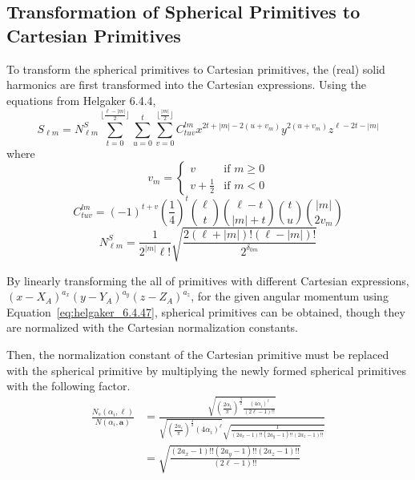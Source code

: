 \documentclass[letterpaper]{article}
\begin{document}
\subsection{Transformation of Spherical Primitives to Cartesian Primitives}
To transform the spherical primitives to Cartesian primitives, the (real) solid
harmonics are first transformed into the Cartesian expressions.
Using the equations from Helgaker 6.4.4,
\begin{equation}
  \label{eq:helgaker_6.4.47}
  S_{\ell m}
  =
  N_{\ell m}^S
  \sum_{t=0}^{\lfloor \frac{\ell - |m|}{2} \rfloor}
  \sum_{u=0}^t \sum_{v=0}^{\lfloor\frac{|m|}{2} \rfloor}
  C^{lm}_{tuv} x^{2t + |m| - 2(u+v_m)} y^{2(u+v_m)} z^{\ell - 2t - |m|}
\end{equation}
where
\begin{equation}
  \label{eq:helgaker_6.4.50}
  v_m =
  \begin{cases}
    v & \mbox {if $m \geq 0$}\\
    v + \frac{1}{2} & \mbox {if $m < 0$}
  \end{cases}
\end{equation}
\begin{equation}
  \label{eq:helgaker_6.4.48}
  C^{lm}_{tuv} =
  (-1)^{t+v}
  \left( \frac{1}{4} \right)^t
  \binom{\ell}{t} \binom{\ell -t}{|m| + t} \binom{t}{u} \binom{|m|}{2 v_m}
\end{equation}
\begin{equation}
  \label{eq:helgaker_6.4.49}
  N_{\ell m}^S =
  \frac{1}{2^{|m|} \ell!}
  \sqrt{
    \frac{2 (\ell + |m|)! (\ell - |m|)!}{2^{\delta_{0m}}}
  }
\end{equation}

By linearly transforming the all of primitives with different Cartesian
expressions, $(x - X_A)^{a_x} (y - Y_A)^{a_y} (z - Z_A)^{a_z}$, for the given
angular momentum using Equation~\ref{eq:helgaker_6.4.47}, spherical primitives
can be obtained, though they are normalized with the Cartesian normalization
constants.

Then, the normalization constant of the Cartesian primitive must be replaced
with the spherical primitive by multiplying the newly formed spherical
primitives with the following factor.
\begin{equation}
  \begin{split}
    \frac{N_s(\alpha_i, \ell)}{N(\alpha_i, \mathbf{a})}
    &= \frac{
      \sqrt{
        \left(\frac{2 \alpha_i}{\pi} \right)^{\frac{3}{2}}
        \frac{(4 \alpha_i)^{\ell}}{(2\ell - 1)!!}
      }
    }{
      \sqrt{
        \left(\frac{2 \alpha_i}{\pi} \right)^{\frac{3}{2}} (4 \alpha_i)^{\ell}
      }
      \sqrt{
        \frac{1}{(2 a_x -1)!! (2 a_y -1)!! (2 a_z -1)!!}
      }
    }\\
    &= \sqrt{\frac{(2 a_x -1)!! (2 a_y -1)!! (2 a_z -1)!!}{(2\ell - 1)!!}}
  \end{split}
\end{equation}
\end{document}
